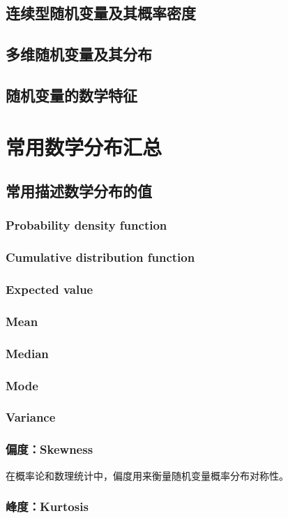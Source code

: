 \documentclass[11pt]{book}
\newcounter{#2}
\newcounter{#2}[#1]
\numberwithin{#2}{#1}
\begin{document}
	\section{连续型随机变量及其概率密度}
	\section{多维随机变量及其分布}
	\section{随机变量的数学特征}
	
	\chapter{常用数学分布汇总}
		\section{常用描述数学分布的值}
			\subsection{Probability density function}
			\subsection{Cumulative distribution function}
			\subsection{Expected value}
			\subsection{Mean}
			\subsection{Median}
			\subsection{Mode}
			\subsection{Variance}
			\subsection{偏度：Skewness}
				在概率论和数理统计中，偏度用来衡量随机变量概率分布对称性。
			\subsection{峰度：Kurtosis}
\end{document}
